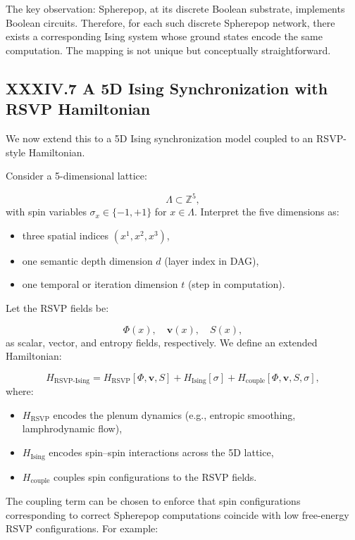 \documentclass[12pt,letterpaper]{article}
\begin{document}
The key observation: Spherepop, at its discrete Boolean substrate, implements Boolean circuits. Therefore, for each such discrete Spherepop network, there exists a corresponding Ising system whose ground states encode the same computation. The mapping is not unique but conceptually straightforward.

\subsection{XXXIV.7 A 5D Ising Synchronization with RSVP Hamiltonian}

We now extend this to a 5D Ising synchronization model coupled to an RSVP-style Hamiltonian.

Consider a 5-dimensional lattice:

\[
\Lambda \subset \mathbb{Z}^5,
\]
with spin variables $\sigma_x \in \{-1,+1\}$ for $x \in \Lambda$. Interpret the five dimensions as:

\begin{itemize}
  \item three spatial indices $(x^1, x^2, x^3)$,
  \item one semantic depth dimension $d$ (layer index in DAG),
  \item one temporal or iteration dimension $t$ (step in computation).
\end{itemize}

Let the RSVP fields be:

\[
\Phi(x), \quad \mathbf{v}(x), \quad S(x),
\]
as scalar, vector, and entropy fields, respectively. We define an extended Hamiltonian:

\[
H_{\text{RSVP-Ising}} = H_{\text{RSVP}}[\Phi, \mathbf{v}, S]
+ H_{\text{Ising}}[\sigma]
+ H_{\text{couple}}[\Phi, \mathbf{v}, S, \sigma],
\]
where:

\begin{itemize}
  \item $H_{\text{RSVP}}$ encodes the plenum dynamics (e.g., entropic smoothing, lamphrodynamic flow),
  \item $H_{\text{Ising}}$ encodes spin--spin interactions across the 5D lattice,
  \item $H_{\text{couple}}$ couples spin configurations to the RSVP fields.
\end{itemize}

The coupling term can be chosen to enforce that spin configurations corresponding to correct Spherepop computations coincide with low free-energy RSVP configurations. For example:
\end{document}
